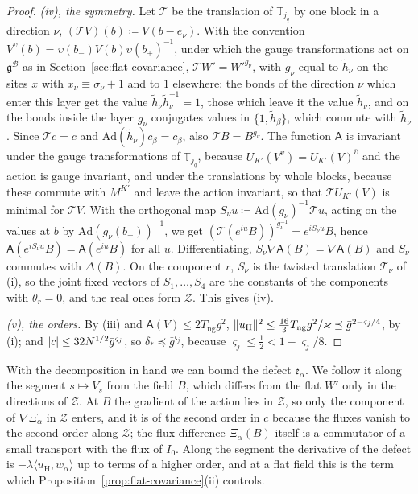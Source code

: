 \documentclass[11pt]{preprint}
\DeclarePairedDelimiter{\abs}{\lvert}{\rvert}
\DeclarePairedDelimiter{\norm}{\lVert}{\rVert}
\numberwithin{equation}{section}
\theoremstyle{definition}
\theoremstyle{remark}
\theoremstyle{plain}
\begin{document}
\begin{proof}
\emph{(iv), the symmetry.} Let $\mathcal T$ be the translation of $\mathbb T_{j_q}$ by one block in a direction $\nu$, $(\mathcal TV)(b) \coloneqq V(b - e_\nu)$. With the convention $V^\upsilon(b) = \upsilon(b_-)V(b)\upsilon(b_+)^{-1}$, under which the gauge transformations act on $\mathfrak g^{\mathcal B}$ as in Section~\ref{sec:flat-covariance}, $\mathcal TW' = W'^{g_\nu}$, with $g_\nu$ equal to $\tilde h_\nu$ on the sites $x$ with $x_\nu \equiv \sigma_\nu + 1$ and to $1$ elsewhere: the bonds of the direction $\nu$ which enter this layer get the value $\tilde h_\nu\tilde h_\nu^{-1} = 1$, those which leave it the value $\tilde h_\nu$, and on the bonds inside the layer $g_\nu$ conjugates values in $\{ 1, \tilde h_\beta \}$, which commute with $\tilde h_\nu$. Since $\mathcal Tc = c$ and $\mathrm{Ad}(\tilde h_\nu)c_\beta = c_\beta$, also $\mathcal TB = B^{g_\nu}$. The function $\mathsf A$ is invariant under the gauge transformations of $\mathbb T_{j_q}$, because $U_{K'}(V^\upsilon) = U_{K'}(V)^{\bar\upsilon}$ \cite[(181), p.~307]{BalabanVAR} and the action is gauge invariant, and under the translations by whole blocks, because these commute with $M^{K'}$ and leave the action invariant, so that $\mathcal TU_{K'}(V)$ is minimal for $\mathcal TV$. With the orthogonal map $S_\nu u \coloneqq \mathrm{Ad}(g_\nu)^{-1}\mathcal Tu$, acting on the values at $b$ by $\mathrm{Ad}(g_\nu(b_-))^{-1}$, we get $(\mathcal T(e^{iu}B))^{g_\nu^{-1}} = e^{iS_\nu u}B$, hence $\mathsf A(e^{iS_\nu u}B) = \mathsf A(e^{iu}B)$ for all $u$. Differentiating, $S_\nu\nabla\mathsf A(B) = \nabla\mathsf A(B)$ and $S_\nu$ commutes with $\Delta(B)$. On the component $r$, $S_\nu$ is the twisted translation $\mathcal T_\nu$ of (i), so the joint fixed vectors of $S_1, \dots, S_4$ are the constants of the components with $\theta_r = 0$, and the real ones form $\mathcal Z$. This gives (iv).

\emph{(v), the orders.} By (iii) and $\mathsf A(V) \leq 2T_{\mathrm{ng}}g^2$, $\norm{u_{\mathrm H}}^2 \leq \frac{16}3T_{\mathrm{ng}}g^2/\varkappa \preceq \bar g^{2-\varsigma_j/4}$, by (i); and $\abs c \leq 32N^{1/2}\bar g^{\varsigma_j}$, so $\delta_* \preceq \bar g^{\varsigma_j}$, because $\varsigma_j \leq \frac12 < 1 - \varsigma_j/8$.
\end{proof}

With the decomposition in hand we can bound the defect $\mathfrak e_\alpha$. We follow it along the segment $s \mapsto V_s$ from the field $B$, which differs from the flat $W'$ only in the directions of $\mathcal Z$. At $B$ the gradient of the action lies in $\mathcal Z$, so only the component of $\nabla\Xi_\alpha$ in $\mathcal Z$ enters, and it is of the second order in $c$ because the fluxes vanish to the second order along $\mathcal Z$; the flux difference $\Xi_\alpha(B)$ itself is a commutator of a small transport with the flux of $I_0$. Along the segment the derivative of the defect is $-\lambda\langle u_{\mathrm H}, w_\alpha\rangle$ up to terms of a higher order, and at a flat field this is the term which Proposition~\ref{prop:flat-covariance}(ii) controls.
\end{document}
